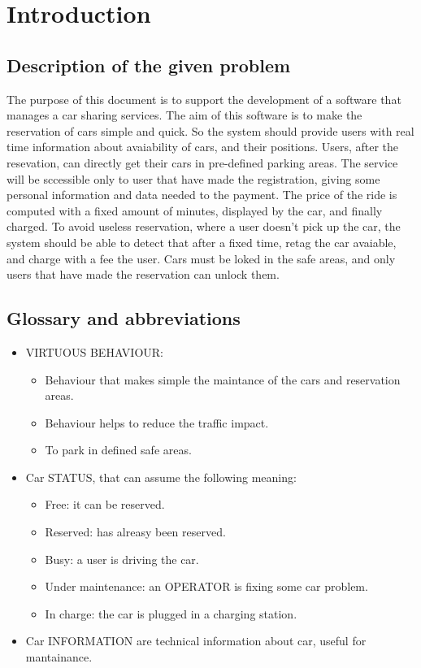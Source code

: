 
\section{Introduction}

\subsection{Description of the given problem}

The purpose of this document is to support the development of a software
that manages a car sharing services. The aim of this software is to
make the reservation of cars simple and quick. So the system should
provide users with real time information about avaiability of cars,
and their positions. Users, after the resevation, can directly get
their cars in pre-defined parking areas. The service will be sccessible
only to user that have made the registration, giving some personal
information and data needed to the payment. The price of the ride
is computed with a fixed amount of minutes, displayed by the car,
and finally charged. To avoid useless reservation, where a user doesn't
pick up the car, the system should be able to detect that after a
fixed time, retag the car avaiable, and charge with a fee the user.
Cars must be loked in the safe areas, and only users that have made
the reservation can unlock them.

\subsection{Glossary and abbreviations}
\begin{itemize}
\item VIRTUOUS BEHAVIOUR:
\begin{itemize}
\item Behaviour that makes simple the maintance of the cars and reservation
areas.
\item Behaviour helps to reduce the traffic impact.
\item To park in defined safe areas.
\end{itemize}
\item Car STATUS, that can assume the following meaning:
\begin{itemize}
\item Free: it can be reserved.
\item Reserved: has alreasy been reserved.
\item Busy: a user is driving the car.
\item Under maintenance: an OPERATOR is fixing some car problem.
\item In charge: the car is plugged in a charging station.
\end{itemize}
\item Car INFORMATION are technical information about car, useful for mantainance.
\end{itemize}

